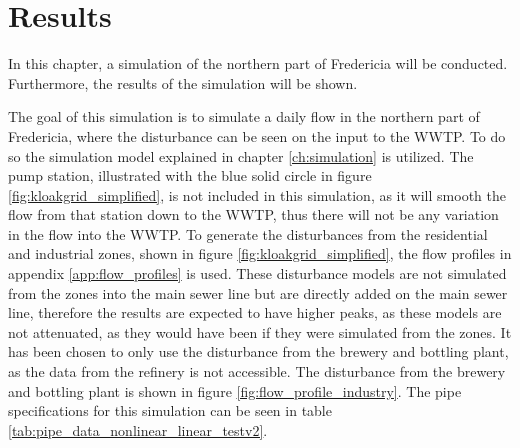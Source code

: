 \chapter{Results}\label{ch:results}
In this chapter, a simulation of the northern part of Fredericia will be conducted. Furthermore, the results of the simulation will be shown.

The goal of this simulation is to simulate a daily flow in the northern part of Fredericia, where the disturbance can be seen on the input to the WWTP. To do so the simulation model explained in chapter \ref{ch:simulation} is utilized. The pump station, illustrated with the blue solid circle in figure \ref{fig:kloakgrid_simplified}, is not included in this simulation, as it will smooth the flow from that station down to the WWTP, thus there will not be any variation in the flow into the WWTP. To generate the disturbances from the residential and industrial zones, shown in figure \ref{fig:kloakgrid_simplified}, the flow profiles in appendix \ref{app:flow_profiles} is used. These disturbance models are not simulated from the zones into the main sewer line but are directly added on the main sewer line, therefore the results are expected to have higher peaks, as these models are not attenuated, as they would have been if they were simulated from the zones. It has been chosen to only use the disturbance from the brewery and bottling plant, as the data from the refinery is not accessible. The disturbance from the brewery and bottling plant is shown in figure \ref{fig:flow_profile_industry}. The pipe specifications for this simulation can be seen in table \ref{tab:pipe_data_nonlinear_linear_testv2}.  
